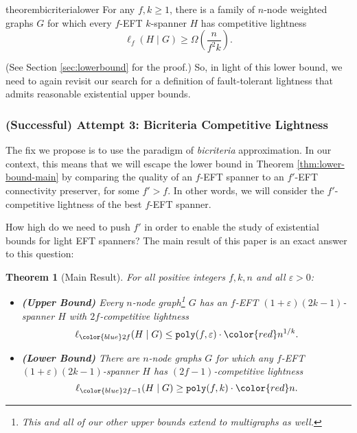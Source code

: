 \documentclass{article}
\newif\ifshort
\theoremstyle{plain}
\newtheorem{theorem}{Theorem}
\theoremstyle{definition}
\newcommand{\eps}{\varepsilon}
\begin{document}
\begin{restatable}{theorem}{bicriterialower} \label{thm:lower-bound-main}
    For any $f, k \geq 1$, there is a family of $n$-node weighted graphs $G$ for which every $f$-EFT $k$-spanner $H$ has competitive lightness
    $$\ell_{f}(H \mid G) \geq \Omega\left( \frac{n}{f^2 k}\right).$$
\end{restatable}

(See \ifshort Appendix~\ref{app:lowerbound} \else Section \ref{sec:lowerbound} \fi for the proof.)
So, in light of this lower bound, we need to again revisit our search for a definition of fault-tolerant lightness that admits reasonable existential upper bounds.

\subsubsection{(Successful) Attempt 3: Bicriteria Competitive Lightness}

The fix we propose is to use the paradigm of \emph{bicriteria} approximation.
In our context, this means that we will escape the lower bound in Theorem \ref{thm:lower-bound-main} by comparing the quality of an $f$-EFT spanner to an $f'$-EFT connectivity preserver, for some $f' > f$.  In other words, we will consider the $f'$-competitive lightness of the best $f$-EFT spanner.

How high do we need to push $f'$ in order to enable the study of existential bounds for light EFT spanners?
The main result of this paper is an exact answer to this question:

\begin{theorem} [Main Result] \label{thm:intromain}
    For all positive integers $f, k, n$ and all $\eps > 0$:
    \begin{itemize}
    \item \textbf{(Upper Bound)} Every $n$-node graph\footnote{This and all of our other upper bounds extend to multigraphs as well.} $G$ has an $f$-EFT $(1+\eps)(2k-1)$-spanner $H$ with $2f$-competitive lightness
    $$\ell_{\color{blue} 2f}(H \mid G) \le \texttt{poly}(f, \eps) \cdot {\color{red} n^{1/k}}.$$
    
    \item \textbf{(Lower Bound)} There are $n$-node graphs $G$ for which any $f$-EFT $(1+\eps)(2k-1)$-spanner $H$ has $(2f-1)$-competitive lightness
    $$\ell_{\color{blue} 2f-1}(H \mid G) \ge \texttt{poly}(f, k) \cdot {\color{red} n}.$$
    \end{itemize}
\end{theorem}
\end{document}
